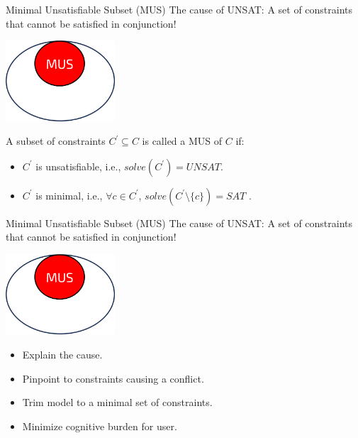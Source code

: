 \documentclass{cons-beamer}
\begin{document}
\begin{frame}{Minimal Unsatisfiable Subset (MUS)}
  The cause of UNSAT: A set of constraints that cannot be satisfied in conjunction! 

  \begin{center}
    \includegraphics[height=30mm]{images/texpl_img/mus.png}
  \end{center}

  \begin{definition}
    A subset of constraints $C^{\prime} \subseteq C$ is called a MUS of $C$ if:
    \begin{itemize}
      \item $C^{\prime}$ is unsatisfiable, i.e., $solve(C^{\prime}) = UNSAT$.
      \item $C^{\prime}$ is minimal, i.e., $\forall c \in C^{\prime}$, $solve(C^{\prime} \setminus \{c\}) = SAT $ .
    \end{itemize}
  \end{definition}
\end{frame}

\begin{frame}{Minimal Unsatisfiable Subset (MUS)}
  The cause of UNSAT: A set of constraints that cannot be satisfied in conjunction! 

  \begin{center}
    \includegraphics[height=30mm]{images/texpl_img/mus.png}

    \begin{itemize}
      \item Explain the cause.
      \item Pinpoint to constraints causing a conflict.
      \item Trim model to a minimal set of constraints.
      \item Minimize cognitive burden for user.
    \end{itemize}      
  \end{center}
\end{frame}
\end{document}
